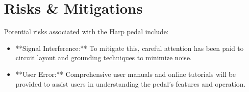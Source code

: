 \chapter{Risks & Mitigations}

Potential risks associated with the Harp pedal include:
\begin{itemize}
\item **Signal Interference:** To mitigate this, careful attention has been paid to circuit layout and grounding techniques to minimize noise.
\item **User Error:** Comprehensive user manuals and online tutorials will be provided to assist users in understanding the pedal's features and operation.
\end{itemize}
